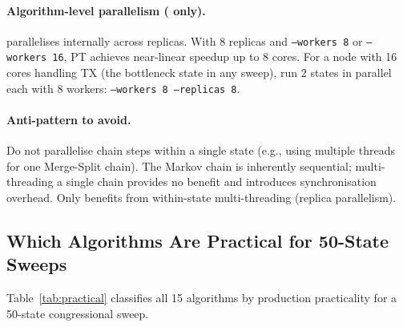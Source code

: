 \paragraph{Algorithm-level parallelism (\pt{} only).}
\pt{} parallelises internally across replicas.
With 8 replicas and \texttt{--workers 8} or \texttt{--workers 16},
PT achieves near-linear speedup up to 8 cores.
For a node with 16 cores handling TX (the bottleneck state in any sweep),
run 2 states in parallel each with 8 workers:
\texttt{--workers 8 --replicas 8}.

\paragraph{Anti-pattern to avoid.}
Do not parallelise chain steps within a single state (e.g., using multiple
threads for one Merge-Split chain).
The Markov chain is inherently sequential; multi-threading a single chain
provides no benefit and introduces synchronisation overhead.
Only \pt{} benefits from within-state multi-threading (replica parallelism).

\subsection{Which Algorithms Are Practical for 50-State Sweeps}

Table~\ref{tab:practical} classifies all 15 algorithms by production
practicality for a 50-state congressional sweep.


